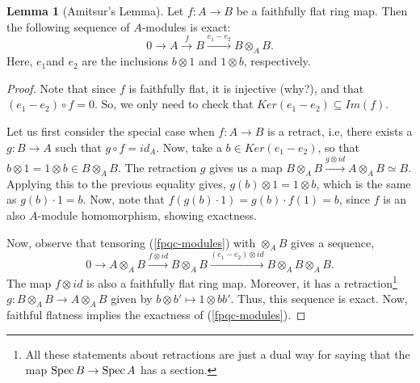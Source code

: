 \documentclass[11pt]{amsart}
\newcommand{\Spec}{{\rm Spec \,}}
\theoremstyle{definition}
\newtheorem{lemma}[theorem]{Lemma}
\begin{document}
\begin{lemma}[Amitsur's Lemma]\label{Amitsur}
Let $f: A\rightarrow B$ be a faithfully flat ring map. Then the following sequence of $A$-modules is exact:
\begin{equation}\label{fpqc-modules}
0\rightarrow A\overset{f}{\rightarrow} B \overset{e_1-e_2}{\rightarrow} B\otimes_A B.
\end{equation}
Here, $e_1$and $e_2$ are the inclusions $b\otimes 1$ and $1\otimes b$, respectively.
\end{lemma}
\begin{proof}
Note that since $f$ is faithfully flat, it is injective (why?), and that $(e_1-e_2)\circ f=0$. So, we only need to check that $Ker(e_1-e_2)\subseteq Im(f)$.

Let us first consider the special case when $f:A\rightarrow B$ is a retract, i.e, there exists a $g:B\rightarrow A$ such that $g\circ f = id_A$. Now, take a $b\in Ker(e_1-e_2)$, so that  $b\otimes 1 = 1\otimes b \in B\otimes_A B$. The retraction $g$ gives us a map $B\otimes_A B\overset{g\otimes id}{\rightarrow} A\otimes_A B\simeq B$. Applying this to the previous equality gives, $g(b)\otimes 1=1\otimes b$, which is the same as $g(b)\cdot 1=b$. Now, note that $f(g(b)\cdot 1)=g(b)\cdot f(1)=b$, since $f$ is an also $A$-module homomorphism, showing exactness.

Now, observe that tensoring (\ref{fpqc-modules}) with $\otimes_A B$ gives a sequence,
\[0\longrightarrow A\otimes_A B\overset{f\otimes id}{\longrightarrow} B\otimes_A B \overset{(e_1-e_2)\otimes id}{\longrightarrow} B\otimes_A B\otimes_A B.\]
The map $f\otimes id$ is also a faithfully flat ring map. Moreover, it has a retraction\footnote{All these statements about retractions are just a dual way for saying that the map $\Spec B\rightarrow \Spec A$ has a section.} $g: B\otimes_A B\rightarrow A\otimes_A B$ given by $b\otimes b'\mapsto 1\otimes bb'$. Thus, this sequence is exact. Now, faithful flatness implies the exactness of (\ref{fpqc-modules}).
\end{proof}
\end{document}
